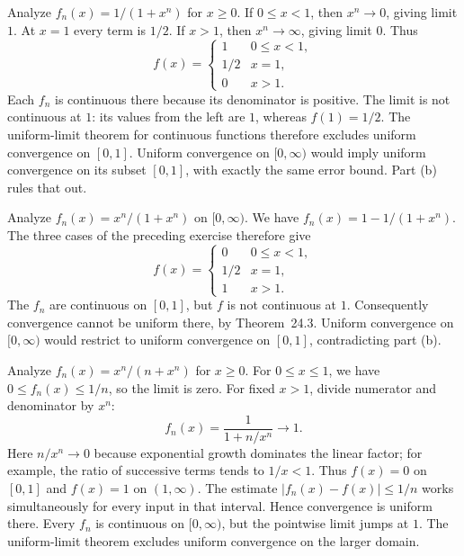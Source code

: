 \goal Analyze $f_n(x)=1/(1+x^n)$ for $x\ge0$.
If $0\le x<1$, then $x^n\to0$, giving limit $1$.
At $x=1$ every term is $1/2$.
If $x>1$, then $x^n\to\infty$, giving limit $0$. Thus
\[
 f(x)=\begin{cases}1&0\le x<1,\\1/2&x=1,\\0&x>1.\end{cases}
\]
Each $f_n$ is continuous there because its denominator is positive.
The limit is not continuous at $1$: its values from the left are $1$,
whereas $f(1)=1/2$. The uniform-limit theorem for continuous functions
therefore excludes uniform convergence on $[0,1]$.
Uniform convergence on $[0,\infty)$ would imply uniform convergence on
its subset $[0,1]$, with exactly the same error bound. Part (b) rules that out.

\goal Analyze $f_n(x)=x^n/(1+x^n)$ on $[0,\infty)$.
We have $f_n(x)=1-1/(1+x^n)$. The three cases of the preceding
exercise therefore give
\[
 f(x)=\begin{cases}0&0\le x<1,\\1/2&x=1,\\1&x>1.\end{cases}
\]
The $f_n$ are continuous on $[0,1]$, but $f$ is not continuous at $1$.
Consequently convergence cannot be uniform there, by Theorem~24.3.
Uniform convergence on $[0,\infty)$ would restrict to uniform convergence
on $[0,1]$, contradicting part (b).
\answer{The displayed $f$ is the limit; convergence is uniform on neither
$[0,1]$ nor $[0,\infty)$.}

\goal Analyze $f_n(x)=x^n/(n+x^n)$ for $x\ge0$.
For $0\le x\le1$, we have $0\le f_n(x)\le1/n$, so the limit is zero.
For fixed $x>1$, divide numerator and denominator by $x^n$:
\[
 f_n(x)=\frac1{1+n/x^n}\longrightarrow1.
\]
Here $n/x^n\to0$ because exponential growth dominates the linear factor;
for example, the ratio of successive terms tends to $1/x<1$.
Thus $f(x)=0$ on $[0,1]$ and $f(x)=1$ on $(1,\infty)$.
The estimate $|f_n(x)-f(x)|\le1/n$ works simultaneously for every input
in that interval. Hence convergence is uniform there.
Every $f_n$ is continuous on $[0,\infty)$, but the pointwise limit jumps
at $1$. The uniform-limit theorem excludes uniform convergence on the larger domain.
\answer{Uniform convergence holds on $[0,1]$, and fails on $[0,\infty)$.}

